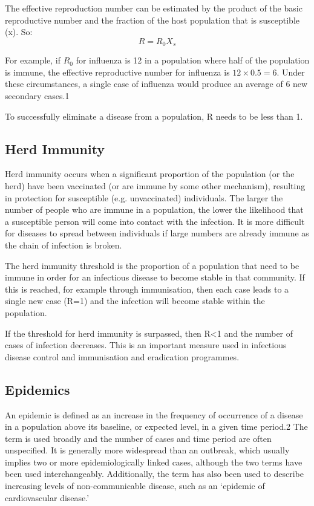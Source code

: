 \documentclass[fontsize=17pt]{article}
\begin{document}
The effective reproduction number can be estimated by the product of the basic reproductive number and the fraction of the host population that is susceptible (x). So:
\begin{equation*}
R = R_{0}X_{s}
\end{equation*}

For example, if $R_0$ for influenza is 12 in a population where half of the population is immune, the effective reproductive number for influenza is $12\times0.5=6$. Under these circumstances, a single case of influenza would produce an average of 6 new secondary cases.1

To successfully eliminate a disease from a population, R needs to be less than 1.\

\subsection{Herd Immunity}

Herd immunity occurs when a significant proportion of the population (or the herd) have been vaccinated (or are immune by some other mechanism), resulting in protection for susceptible (e.g. unvaccinated) individuals. The larger the number of people who are immune in a population, the lower the likelihood that a susceptible person will come into contact with the infection. It is more difficult for diseases to spread between individuals if large numbers are already immune as the chain of infection is broken.

The herd immunity threshold is the proportion of a population that need to be immune in order for an infectious disease to become stable in that community. If this is reached, for example through immunisation, then each case leads to a single new case (R=1) and the infection will become stable within the population.



If the threshold for herd immunity is surpassed, then R<1 and the number of cases of infection decreases. This is an important measure used in infectious disease control and immunisation and eradication programmes.



\subsection{Epidemics}

An epidemic is defined as an increase in the frequency of occurrence of a disease in a population above its baseline, or expected level, in a given time period.2 The term is used broadly and the number of cases and time period are often unspecified. It is generally more widespread than an outbreak, which usually implies two or more epidemiologically linked cases, although the two terms have been used interchangeably. Additionally, the term has also been used to describe increasing levels of non-communicable disease, such as an ‘epidemic of cardiovascular disease.’
\end{document}
